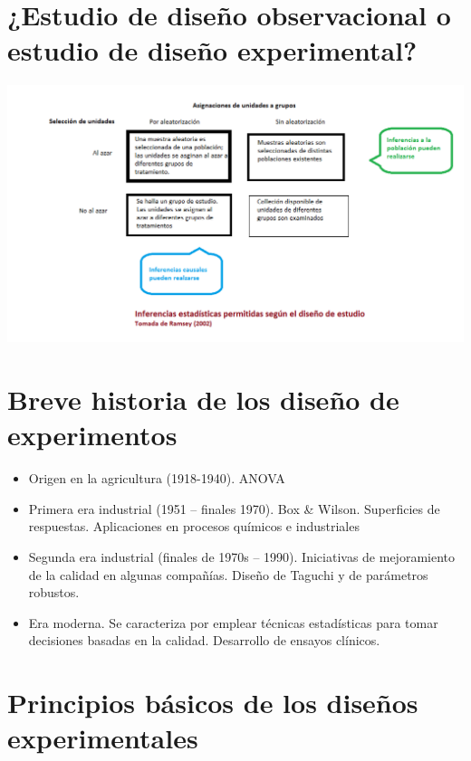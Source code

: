 \documentclass[]{book}
\providecommand{\tightlist}{%
  \setlength{\itemsep}{0pt}\setlength{\parskip}{0pt}}
\begin{document}
\section{¿Estudio de diseño observacional o estudio de diseño
experimental?}\label{estudio-de-diseno-observacional-o-estudio-de-diseno-experimental}

\begin{center}\includegraphics[width=1.5\linewidth]{imagenes/ramsey} \end{center}

\section{Breve historia de los diseño de
experimentos}\label{breve-historia-de-los-diseno-de-experimentos}

\begin{itemize}
\tightlist
\item
  Origen en la agricultura (1918-1940). ANOVA
\item
  Primera era industrial (1951 -- finales 1970). Box \& Wilson.
  Superficies de respuestas. Aplicaciones en procesos químicos e
  industriales
\item
  Segunda era industrial (finales de 1970s -- 1990). Iniciativas de
  mejoramiento de la calidad en algunas compañías. Diseño de Taguchi y
  de parámetros robustos.
\item
  Era moderna. Se caracteriza por emplear técnicas estadísticas para
  tomar decisiones basadas en la calidad. Desarrollo de ensayos
  clínicos.
\end{itemize}

\section{Principios básicos de los diseños
experimentales}\label{principios-basicos-de-los-disenos-experimentales}
\end{document}
